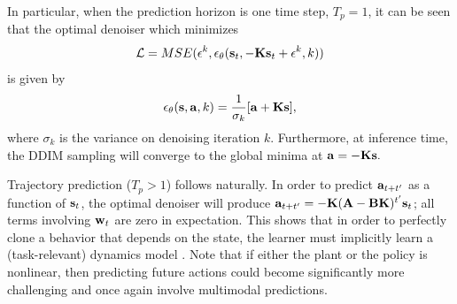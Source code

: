 In particular, when the prediction horizon is one time step, $T_p=1$, it can be seen that the optimal denoiser which minimizes 
\begin{equation}
    \mathcal{L}=MSE(\mathbf{\epsilon}^k,\epsilon_\theta(\mathbf{s}_t, -{\bf K}{\bf s}_t + \mathbf{\epsilon}^k, k))
\end{equation}
is given by $$\epsilon_\theta({\bf s}, {\bf a}, k) = \frac{1}{\sigma_k}[{\bf a} + {\bf K}{\bf s}],$$ where $\sigma_k$ is the variance on denoising iteration $k$. Furthermore, at inference time, the DDIM sampling will converge to the global minima at ${\bf a} = -{\bf Ks}.$

Trajectory prediction ($T_p>1$) follows naturally. In order to predict ${\bf a}_{t+t'}$ as a function of ${\bf s}_t$, the optimal denoiser will produce ${\bf a}_{t+t'} = -{\bf K}({\bf A}-{\bf BK})^{t'}{\bf s}_t$; all terms involving ${\bf w}_t$ are zero in expectation. This shows that in order to perfectly clone a behavior that depends on the state, the learner must implicitly learn a (task-relevant) dynamics model \cite{subramanian2019approximate,zhang2020learning}. Note that if either the plant or the policy is nonlinear, then predicting future actions could become significantly more challenging and once again involve multimodal predictions.

